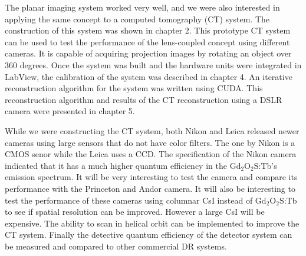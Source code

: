 The planar imaging system worked very well, and we were also interested in applying the same concept to a computed tomography (CT) system.  The construction of this system was shown in chapter 2.  This prototype CT system can be used to test the performance of the lens-coupled concept using different cameras.  It is capable of acquiring projection images by rotating an object over 360 degrees.  Once the system was built and the hardware units were integrated in LabView, the calibration of the system was described in chapter 4.  An iterative reconstruction algorithm for the system was written using CUDA.  This reconstruction algorithm and results of the CT reconstruction using a DSLR camera were presented in chapter 5.  

While we were constructing the CT system, both Nikon and Leica released newer cameras using large sensors that do not have color filters.  The one by Nikon is a CMOS senor while the Leica uses a CCD.  The specification of the Nikon camera indicated that it has a much higher quantum efficiency in the $\mathrm{Gd_2O_2S}$:Tb's emission spectrum.  It will be very interesting to test the camera and compare its performance with the Princeton and Andor camera.  It will also be interesting to test the performance of these cameras using columnar CsI instead of $\mathrm{Gd_2O_2S}$:Tb to see if spatial resolution can be improved.  However a large CsI will be expensive.  The ability to scan in helical orbit can be implemented to improve the CT system.  Finally the detective quantum efficiency of the detector system can be measured and compared to other commercial DR systems.

